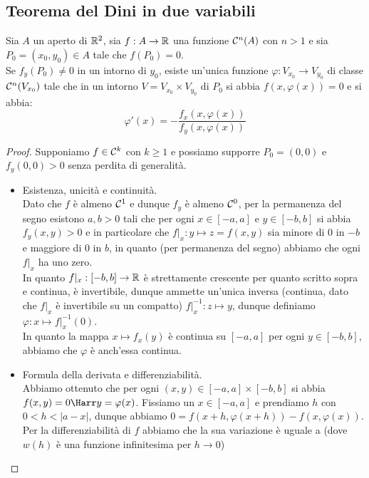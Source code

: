 \documentclass{article}
\begin{document}
\subsection{Teorema del Dini in due variabili}

\begin{theorem}{}{}
    Sia $A$ un aperto di $\mathbb{R}^2$, sia $f:A\to\mathbb{R}$ una funzione $\mathcal{C}^n(A)$ con $n>1$ e sia $P_0=(x_0,y_0) \in A$ tale che $f(P_0)=0$.\\
    Se $f_y(P_0) \neq 0$ in un intorno di $y_0$, esiste un'unica funzione $\varphi : V_{x_0} \to V_{y_0}$ di classe $\mathcal{C}^n(V_{x_0})$ tale che in un intorno $V=V_{x_0}\times V_{y_0}$ di $P_0$ si abbia $f(x,\varphi(x))=0$ e si abbia:
    \[\varphi'(x)=-\frac{f_x(x,\varphi(x))}{f_y(x,\varphi(x))}\]
\end{theorem}
\begin{proof}
    Supponiamo $f \in \mathcal{C}^k$ con $k\ge 1$ e possiamo supporre $P_0= (0,0)$ e $f_y(0,0)>0$ senza perdita di generalità.\begin{itemize}
        \item Esistenza, unicità e continuità.\\
        Dato che $f$ è almeno $\mathcal{C}^1$ e dunque $f_y$ è almeno $\mathcal{C}^0$, per la permanenza del segno esistono $a,b>0$ tali che per ogni $x \in [-a,a]$ e $y \in [-b,b]$ si abbia $f_y(x,y)>0$ e in particolare che $f|_x : y\mapsto z = f(x,y)$ sia minore di $0$ in $-b$ e maggiore di $0$ in $b$, in quanto (per permanenza del segno) abbiamo che ogni $f|_x$ ha uno zero.\\
        In quanto $f|_x:[-b,b]\to\mathbb{R}$ è strettamente crescente per quanto scritto sopra e continua, è invertibile, dunque ammette un'unica inversa (continua, dato che $f|_x$ è invertibile su un compatto) $f|_x^{-1} : z \mapsto y$, dunque definiamo $\varphi:x \mapsto f|_x^{-1}(0)$.\\
        In quanto la mappa $x\mapsto f_x(y)$ è continua su $[-a,a]$ per ogni $y \in [-b,b]$, abbiamo che $\varphi$ è anch'essa continua.
        \item Formula della derivata e differenziabilità.\\
        Abbiamo ottenuto che per ogni  $(x,y)\in[-a,a]\times [-b,b]$ si abbia $f(x,y)=0\Harr y = \varphi (x)$. Fissiamo un $x \in [-a,a]$ e prendiamo $h$ con $0<h<|a-x|$, dunque abbiamo $0 = f(x+h,\varphi(x+h)) - f(x,\varphi(x))$.\\
        Per la differenziabilità di $f$ abbiamo che la sua variazione è uguale a (dove $w(h)$ è una funzione infinitesima per $h\to 0$)

\end{itemize}
\end{proof}
\end{document}
